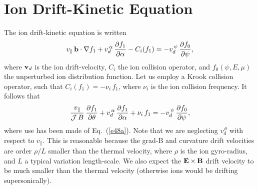 \documentclass[12pt,prb,aps,notitlepage]{revtex4-1}
\begin{document}
\section{Ion Drift-Kinetic Equation}
 The ion drift-kinetic equation is written
 \begin{equation}
 v_\parallel\,{\bf b}\cdot\nabla f_1 + v_d^{\,\alpha}\,\frac{\partial f_1}{\partial\alpha} - C_i(f_1)=- v_d^{\,\psi}\,\frac{\partial f_0}{\partial\psi},
 \end{equation}
 where ${\bf v}_d$ is the ion drift-velocity, $C_i$ the ion collision operator, and $f_0(\psi,E,\mu)$ the unperturbed ion distribution function. Let us
 employ a Krook collision operator, such that $C_i(f_1)= - \nu_i\,f_1$, where $\nu_i$ is the ion collision frequency. It follows that
 \begin{equation}\label{e71}
 \frac{v_\parallel}{{\cal J}\,B}\,\frac{\partial f_1}{\partial\theta} + v_d^{\,\alpha}\,\frac{\partial f_1}{\partial\alpha} + \nu_i\,f_1= - v_d^{\,\psi}\,\frac{\partial f_0}{\partial\psi},
 \end{equation}
 where use has been made of Eq.~(\ref{e48a}).
 Note that we are neglecting $v_d^{\,\theta}$ with respect to $v_\parallel$. This is reasonable because the grad-B and curvature drift velocities are
 order $\rho/L$ smaller than the thermal velocity, where $\rho$ is the ion gyro-radius, and $L$ a typical variation length-scale. We also
 expect the ${\bf E}\times{\bf B}$ drift velocity to be much smaller than the thermal velocity (otherwise ions would be drifting supersonically). 
 
\end{document}
